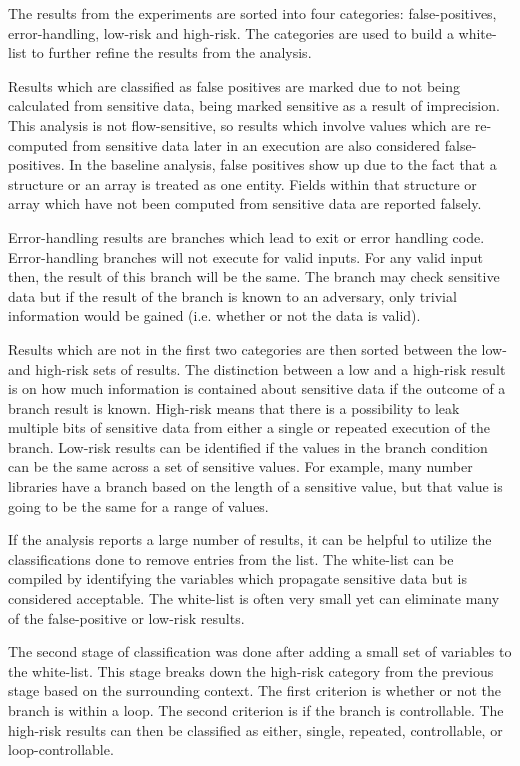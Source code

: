  The results from the experiments are sorted into four categories:
 false-positives, error-handling, low-risk and high-risk. The categories are used to
 build a white-list to further refine the results from the analysis.

 Results which are classified as false positives are marked due to not being
 calculated from sensitive data, being marked sensitive as a result of
 imprecision. This analysis is not flow-sensitive, so results which involve
 values which are re-computed from sensitive data later in an execution are also
 considered false-positives. In the baseline analysis, false positives show up
 due to the fact that a structure or an array is treated as one entity. Fields
 within that structure or array which have not been computed from sensitive data
 are reported falsely.

 Error-handling results are branches which lead to exit or error handling code.
 Error-handling branches will not execute for valid inputs. For any valid input
 then, the result of this branch will be the same. The branch may check
 sensitive data but if the result of the branch is known to an adversary, only
 trivial information would be gained (i.e. whether or not the data is valid).

 Results which are not in the first two categories are then sorted between the
 low- and high-risk sets of results. The distinction between a low and a
 high-risk result is on how much information is contained about sensitive data
 if the outcome of a branch result is known. High-risk means that there is a
 possibility to leak multiple bits of sensitive data from either a single or
 repeated execution of the branch. Low-risk results can be identified if the
 values in the branch condition can be the same across a set of sensitive
 values. For example, many number libraries have a branch based on the length of
 a sensitive value, but that value is going to be the same for a range of
 values.

 If the analysis reports a large number of results, it can be helpful to utilize
 the classifications done to remove entries from the list. The white-list can be
 compiled by identifying the variables which propagate sensitive data but is
 considered acceptable. The white-list is often very small yet can eliminate
 many of the false-positive or low-risk results.

 The second stage of classification was done after adding a small set of
 variables to the white-list. This stage breaks down the high-risk category from the
 previous stage based on the surrounding context. The first criterion is whether
 or not the branch is within a loop. The second criterion is if the branch is
 controllable. The high-risk results can then be classified as either, single,
 repeated, controllable, or loop-controllable.

